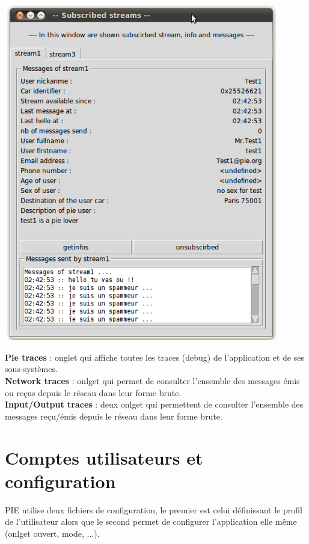 \begin{center}
    \includegraphics[width=0.9\textwidth]{img/subscribed.png}
\end{center}

\textbf{Pie traces} : onglet qui affiche toutes les traces (debug) de l'application et de ses sous-systèmes.\\

\textbf{Network traces} : onlget qui permet de consulter l'ensemble des messages émis ou reçus depuis le réseau dans leur forme brute.\\

\textbf{Input/Output traces} : deux onlget qui permettent de consulter l'ensemble des messages reçu/émis depuis le réseau dans leur forme brute. \\

\section{Comptes utilisateurs et configuration}

PIE utilise deux fichiers de configuration, le premier est celui définissant le profil de l'utilisateur
alors que le second permet de configurer l'application elle même (onlget ouvert, mode, ...).  \\

